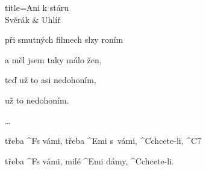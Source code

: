 \begin{song}{title=\predtitle \centering Ani k stáru \\\large Svěrák \& Uhlíř   \vspace*{-0.3cm}}
\begin{centerjustified}
\begin{varwidth}[t]{0.48\textwidth}
    při smutných filmech slzy roním

    a měl jsem taky málo žen,

    teď už to asi nedohoním,

    už to nedohoním.

\dots

	třeba ^{F}s vámi, třeba ^{Emi \z}s~vámi, ^{\z C}chcete-li, ^{C7}

	třeba ^{F}s vámi, milé ^{Emi \z}dámy, ^{\z C}chcete-li.

\end{varwidth}

\end{centerjustified}

\centering
{}

\setcounter{Slokočet}{0}
\end{song}

